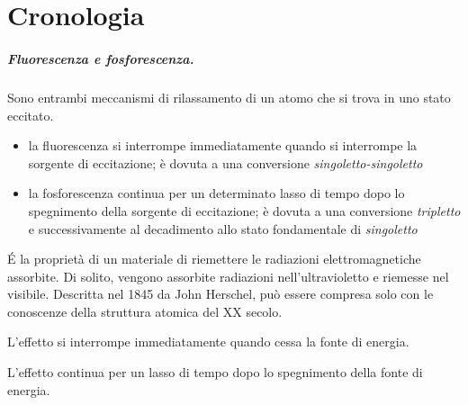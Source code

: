 
\chapter{Cronologia}


\paragraph{Fluorescenza e fosforescenza.}
Sono entrambi meccanismi di rilassamento di un atomo che si trova in uno stato eccitato.
\begin{itemize}
    \item la fluorescenza si interrompe immediatamente quando si interrompe la sorgente di eccitazione; è dovuta a una conversione \textit{singoletto-singoletto}
    \item la fosforescenza continua per un determinato lasso di tempo dopo lo spegnimento della sorgente di eccitazione; è dovuta a una conversione \textit{tripletto} e successivamente al decadimento allo stato fondamentale di \textit{singoletto}
\end{itemize}

\begin{definition}[Fluorescenza]
\'E la proprietà di un materiale di riemettere le radiazioni elettromagnetiche assorbite. Di solito, vengono assorbite radiazioni nell'ultravioletto e riemesse nel visibile. Descritta nel 1845 da John Herschel, può essere compresa solo con le conoscenze della struttura atomica del XX secolo.

\noindent
    L'effetto si interrompe immediatamente quando cessa la fonte di energia.
\end{definition}

\begin{definition}[Fosforescenza]
L'effetto continua per un lasso di tempo dopo lo spegnimento della fonte di energia.
\end{definition}

